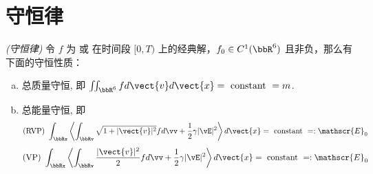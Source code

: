 \chapter{守恒律}
\label{cha:conservatives}

  

  

\begin{lemma}\textit{(守恒律)}
  令 $f$ 为 \eqvp 或 \eqrvp 在时间段 $[0,T)$ 上的经典解，$f_0\in C^1(\bbR^6)$ 且非负，那么有下面的守恒性质：
    \begin{enumerate}[(a)]
      \item 总质量守恒, 即 $\iint_{\bbR^6}fd\vect{v} d\vect{x} = \text { constant } = m$.
      \item 总能量守恒, 即
        \begin{equation}
            \text{(RVP) } \int_{\bbRx}\left\langle\int_{\bbRv} \sqrt{1+|\vect{v}|^{2}} f d \vv+\frac{1}{2} \gamma|\vE|^{2}\right\rangle d \vect{x}=\text { constant }=:\mathscr{E}_{0}
        \end{equation}
        \begin{equation}
            \text{(VP) } \int_{\bbRx}\left\langle\int_{\bbRv} \frac{|\vect{v}|^{2}}{2}  f d \vv+\frac{1}{2} \gamma|\vE|^{2}\right\rangle d \vect{x}=\text { constant }=:\mathscr{E}_{0}
        \end{equation}

    \end{enumerate}
\end{lemma}

